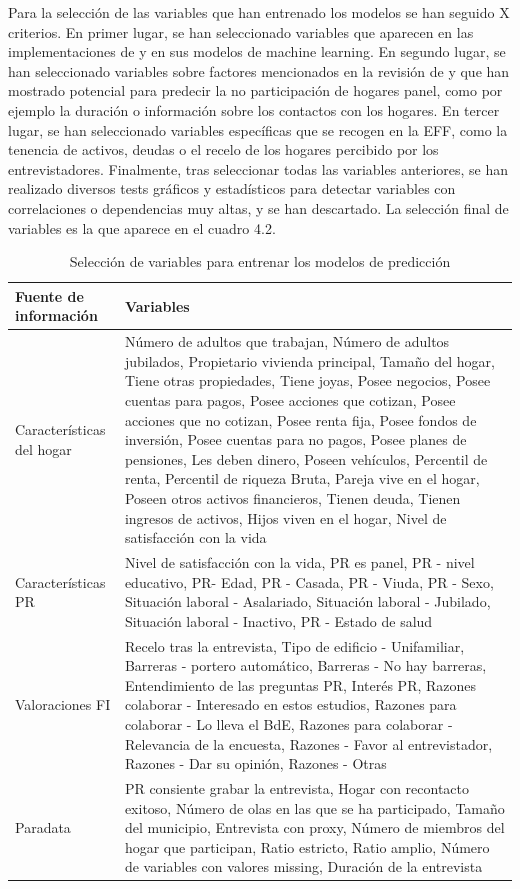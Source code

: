 Para la selección de las variables que han entrenado los modelos se han seguido X criterios. En primer lugar, se han seleccionado variables que aparecen en las implementaciones de \cite{kern2021predicting} y \cite{beste2023case} en sus modelos de machine learning. En segundo lugar, se han seleccionado variables sobre factores mencionados en la revisión de \cite{lynn2018tackling} y que han mostrado potencial para predecir la no participación de hogares panel, como por ejemplo la duración o información sobre los contactos con los hogares. En tercer lugar, se han seleccionado variables específicas que se recogen en la EFF, como la tenencia de activos, deudas o el recelo de los hogares percibido por los entrevistadores. Finalmente, tras seleccionar todas las variables anteriores, se han realizado diversos tests gráficos y estadísticos para detectar variables con correlaciones o dependencias muy altas, y se han descartado. La selección final de variables es la que aparece en el cuadro 4.2.

\begin{table}
    \centering
    \begin{tabular}{|l|p{10cm}|}
    \hline
        \textbf{Fuente de información} & \textbf{Variables} \\ \hline
        Características del hogar & Número de adultos que trabajan, Número de adultos jubilados, Propietario vivienda principal, Tamaño del hogar, Tiene otras propiedades, Tiene joyas, Posee negocios, Posee cuentas para pagos, Posee acciones que cotizan, Posee acciones que no cotizan, Posee renta fija, Posee fondos de inversión, Posee cuentas para no pagos, Posee planes de pensiones, Les deben dinero, Poseen vehículos, Percentil de renta, Percentil de riqueza Bruta, Pareja vive en el hogar, Poseen otros activos financieros, Tienen deuda, Tienen ingresos de activos, Hijos viven en el hogar, Nivel de satisfacción con la vida \\ \hline
        Características PR & Nivel de satisfacción con la vida, PR es panel, PR - nivel educativo, PR- Edad, PR - Casada, PR - Viuda, PR - Sexo, Situación laboral - Asalariado, Situación laboral - Jubilado, Situación laboral - Inactivo, PR - Estado de salud \\ \hline
        Valoraciones FI & Recelo tras la entrevista, Tipo de edificio - Unifamiliar, Barreras - portero automático, Barreras - No hay barreras, Entendimiento de las preguntas PR, Interés PR, Razones colaborar - Interesado en estos estudios, Razones para colaborar - Lo lleva el BdE, Razones para colaborar - Relevancia de la encuesta, Razones - Favor al entrevistador, Razones - Dar su opinión, Razones - Otras \\ \hline
        Paradata & PR consiente grabar la entrevista, Hogar con recontacto exitoso, Número de olas en las que se ha participado, Tamaño del municipio, Entrevista con proxy, Número de miembros del hogar que participan, Ratio estricto, Ratio amplio, Número de variables con valores missing, Duración de la entrevista \\ \hline
    \end{tabular}
    \caption{Selección de variables para entrenar los modelos de predicción}
\end{table}

